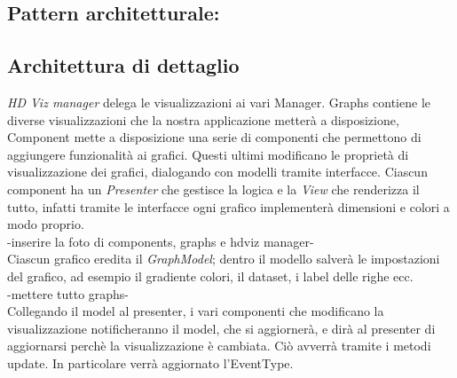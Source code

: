 \documentclass[../manuale_sviluppatore.tex]{subfiles}
\begin{document}
\subsection{Pattern architetturale: }

\subsection{Architettura di dettaglio}
\emph{HD Viz manager} delega le visualizzazioni ai vari Manager. 
Graphs contiene le diverse visualizzazioni che la nostra applicazione metterà a disposizione, Component mette a disposizione una serie di componenti che permettono di aggiungere funzionalità ai grafici.
Questi ultimi modificano le proprietà di visualizzazione dei grafici, dialogando con modelli tramite interfacce. Ciascun component ha un \emph{Presenter} che gestisce la logica e la \emph{View} che renderizza il tutto,
infatti tramite le interfacce ogni grafico implementerà dimensioni e colori a modo proprio.
\\
-inserire la foto di components, graphs e hdviz manager-
\\

Ciascun grafico eredita il \emph{GraphModel}; dentro il modello salverà le impostazioni del grafico, ad esempio il gradiente colori, il dataset, i label delle righe ecc.
\\
-mettere tutto graphs-
\\

Collegando il model al presenter, i vari componenti che modificano la visualizzazione notificheranno il model, che si aggiornerà, e dirà al presenter di aggiornarsi perchè la visualizzazione è cambiata. 
Ciò avverrà tramite i metodi update. In particolare verrà aggiornato l'EventType.
\end{document}
